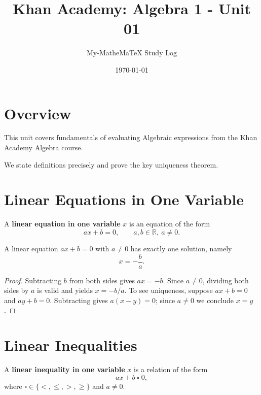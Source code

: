 \documentclass{article}
\title{Khan Academy: Algebra 1 - Unit 01}
\author{My-MatheMaTeX Study Log}
\date{\today}
\begin{document}
\maketitle
\tableofcontents
\newpage

\section{Overview}

This unit covers fundamentals of evaluating Algebraic expressions from the Khan Academy
Algebra course.

We state definitions precisely and prove the key uniqueness theorem.

\section{Linear Equations in One Variable}

\begin{definition}
  A \textbf{linear equation in one variable} $x$ is an equation of the form
  \[
    ax + b = 0, \qquad a, b \in \mathbb{R},\ a \neq 0.
  \]
\end{definition}

\begin{theorem}\label{thm:unique}
  A linear equation $ax + b = 0$ with $a \neq 0$ has exactly one solution,
  namely
  \[
    x = -\frac{b}{a}.
  \]
\end{theorem}

\begin{proof}
  Subtracting $b$ from both sides gives $ax = -b$.
  Since $a \neq 0$, dividing both sides by $a$ is valid and yields
  $x = -b/a$.
  To see uniqueness, suppose $ax + b = 0$ and $ay + b = 0$.
  Subtracting gives $a(x - y) = 0$; since $a \neq 0$ we conclude $x = y$.
\end{proof}

\section{Linear Inequalities}

\begin{definition}
  A \textbf{linear inequality in one variable} $x$ is a relation of the form
  \[
    ax + b \;\square\; 0,
  \]
  where $\square \in \{<,\leq,>,\geq\}$ and $a \neq 0$.
\end{definition}
\end{document}
